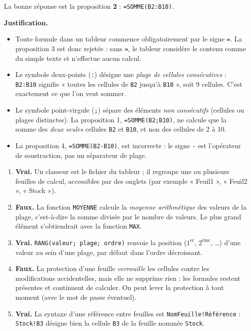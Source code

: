 \documentclass[11pt]{article}
\newcommand{\cle}[1]{{\popxbold\color{popdark}#1}}
\begin{document}
\begin{corrige}\tcblower
La bonne réponse est la proposition \textbf{2} : \texttt{=SOMME(B2:B10)}.

\textbf{Justification.}
\begin{itemize}
\item Toute formule dans un tableur commence obligatoirement par le signe \texttt{=}. La proposition 3 est donc rejetée : sans \texttt{=}, le tableur considère le contenu comme du simple texte et n'effectue aucun calcul.
\item Le symbole \cle{deux-points} (\texttt{:}) désigne une \emph{plage de cellules consécutives} : \texttt{B2:B10} signifie « toutes les cellules de \texttt{B2} jusqu'à \texttt{B10} », soit 9 cellules. C'est exactement ce que l'on veut sommer.
\item Le symbole \cle{point-virgule} (\texttt{;}) sépare des éléments \emph{non consécutifs} (cellules ou plages distinctes). La proposition 1, \texttt{=SOMME(B2;B10)}, ne calcule que la somme des \emph{deux seules} cellules \texttt{B2} et \texttt{B10}, et non des cellules de 2 à 10.
\item La proposition 4, \texttt{=SOMME(B2-B10)}, est incorrecte : le signe \texttt{-} est l'opérateur de soustraction, pas un séparateur de plage.
\end{itemize}
\end{corrige}

\begin{corrige}\tcblower
\begin{enumerate}
\item \textbf{Vrai.} Un classeur est le fichier du tableur ; il regroupe une ou plusieurs feuilles de calcul, accessibles par des onglets (par exemple « Feuil1 », « Feuil2 », « Stock »).
\item \textbf{Faux.} La fonction \texttt{MOYENNE} calcule la \emph{moyenne arithmétique} des valeurs de la plage, c'est-à-dire la somme divisée par le nombre de valeurs. Le plus grand élément s'obtiendrait avec la fonction \texttt{MAX}.
\item \textbf{Vrai.} \texttt{RANG(valeur; plage; ordre)} renvoie la position ($1^{\text{er}}$, $2^{\text{ème}}$, \dots) d'une valeur au sein d'une plage, par défaut dans l'ordre décroissant.
\item \textbf{Faux.} La protection d'une feuille \emph{verrouille} les cellules contre les modifications accidentelles, mais elle ne supprime rien : les formules restent présentes et continuent de calculer. On peut lever la protection à tout moment (avec le mot de passe éventuel).
\item \textbf{Vrai.} La syntaxe d'une référence entre feuilles est \texttt{NomFeuille!Référence} : \texttt{Stock!B3} désigne bien la cellule \texttt{B3} de la feuille nommée \texttt{Stock}.
\end{enumerate}
\end{corrige}
\end{document}

